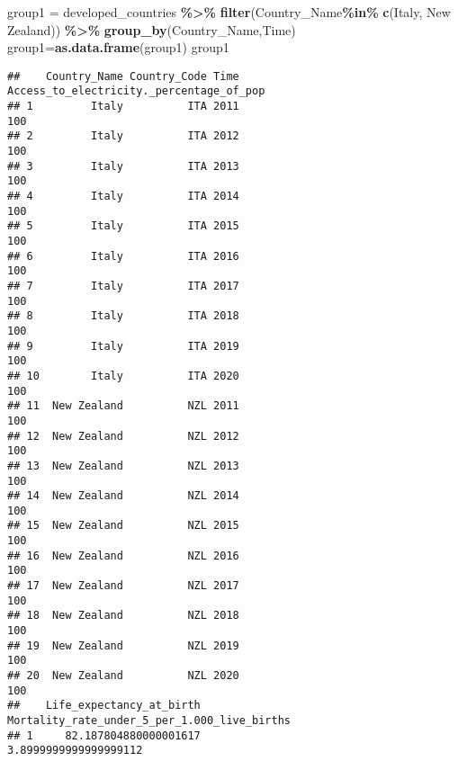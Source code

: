 \documentclass[
]{article}
\newenvironment{Shaded}{\begin{snugshade}}{\end{snugshade}}
\newcommand{\FunctionTok}[1]{\textcolor[rgb]{0.13,0.29,0.53}{\textbf{#1}}}
\newcommand{\NormalTok}[1]{#1}
\newcommand{\OtherTok}[1]{\textcolor[rgb]{0.56,0.35,0.01}{#1}}
\newcommand{\SpecialCharTok}[1]{\textcolor[rgb]{0.81,0.36,0.00}{\textbf{#1}}}
\newcommand{\StringTok}[1]{\textcolor[rgb]{0.31,0.60,0.02}{#1}}
\begin{document}
\begin{Shaded}
\begin{Highlighting}[]
\NormalTok{group1 }\OtherTok{=}\NormalTok{ developed\_countries }\SpecialCharTok{\%\textgreater{}\%}
  \FunctionTok{filter}\NormalTok{(Country\_Name}\SpecialCharTok{\%in\%} \FunctionTok{c}\NormalTok{(}\StringTok{\textquotesingle{}Italy\textquotesingle{}}\NormalTok{, }\StringTok{\textquotesingle{}New Zealand\textquotesingle{}}\NormalTok{)) }\SpecialCharTok{\%\textgreater{}\%}
  \FunctionTok{group\_by}\NormalTok{(Country\_Name,Time)}
\NormalTok{group1}\OtherTok{=}\FunctionTok{as.data.frame}\NormalTok{(group1)}
\NormalTok{group1}
\end{Highlighting}
\end{Shaded}

\begin{verbatim}
##    Country_Name Country_Code Time Access_to_electricity._percentage_of_pop
## 1         Italy          ITA 2011                                      100
## 2         Italy          ITA 2012                                      100
## 3         Italy          ITA 2013                                      100
## 4         Italy          ITA 2014                                      100
## 5         Italy          ITA 2015                                      100
## 6         Italy          ITA 2016                                      100
## 7         Italy          ITA 2017                                      100
## 8         Italy          ITA 2018                                      100
## 9         Italy          ITA 2019                                      100
## 10        Italy          ITA 2020                                      100
## 11  New Zealand          NZL 2011                                      100
## 12  New Zealand          NZL 2012                                      100
## 13  New Zealand          NZL 2013                                      100
## 14  New Zealand          NZL 2014                                      100
## 15  New Zealand          NZL 2015                                      100
## 16  New Zealand          NZL 2016                                      100
## 17  New Zealand          NZL 2017                                      100
## 18  New Zealand          NZL 2018                                      100
## 19  New Zealand          NZL 2019                                      100
## 20  New Zealand          NZL 2020                                      100
##    Life_expectancy_at_birth Mortality_rate_under_5_per_1.000_live_births
## 1     82.187804880000001617                        3.8999999999999999112

\end{verbatim}
\end{document}
